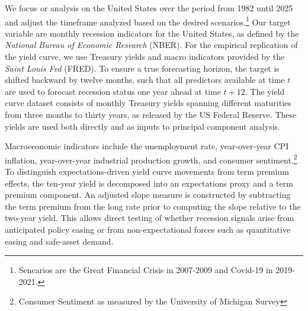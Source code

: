 We focus or analysis on the United States over the period from 1982 until 2025 and adjust the timeframe analyzed based on the desired scenarios.\footnote{Sencarios are the Great Financial Crisis in 2007-2009 and Covid-19 in 2019-2021.} Our target variable are monthly recession indicators for the United States, as defined by the \textit{National Bureau of Economic Research} (NBER). For the empirical replication of the yield curve, we use Treasury yields and macro indicators provided by the \textit{Saint Louis Fed} (FRED).
To ensure a true forecasting horizon, the target is shifted backward by twelve months, such that all predictors available at time $t$ are used to forecast recession status one year ahead at time $t+12$. The yield curve dataset consists of monthly Treasury yields spanning different maturities from three months to thirty years, as released by the US Federal Reserve. These yields are used both directly and as inputs to principal component analysis. 

Macroeconomic indicators include the unemployment rate, year-over-year CPI inflation, year-over-year industrial production growth, and consumer sentiment.\footnote{Consumer Sentiment as measured by the University of Michigan Survey} To distinguish expectations-driven yield curve movements from term premium effects, the ten-year yield is decomposed into an expectations proxy and a term premium component. An adjusted slope measure is constructed by subtracting the term premium from the long rate prior to computing the slope relative to the two-year yield. This allows direct testing of whether recession signals arise from anticipated policy easing or from non-expectational forces such as quantitative easing and safe-asset demand.

